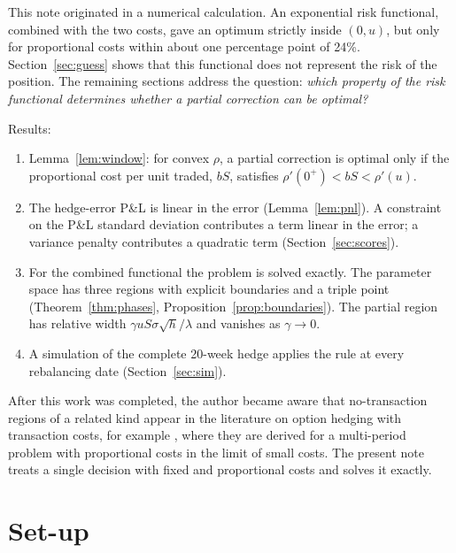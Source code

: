 \documentclass[11pt,a4paper]{article}
\theoremstyle{remark}
\begin{document}
This note originated in a numerical calculation. An exponential risk functional, combined
with the two costs, gave an optimum strictly inside $(0,u)$, but only for proportional costs
within about one percentage point of 24\%. Section~\ref{sec:guess} shows that this
functional does not represent the risk of the position. The remaining sections address the
question: \emph{which property of the risk functional determines whether a partial
correction can be optimal?}

Results:
\begin{enumerate}
  \item Lemma~\ref{lem:window}: for convex $\rho$, a partial correction is optimal only if
        the proportional cost per unit traded, $bS$, satisfies
        $\rho'(0^+) < bS < \rho'(u)$.
  \item The hedge-error P\&L is linear in the error (Lemma~\ref{lem:pnl}). A constraint on
        the P\&L standard deviation contributes a term linear in the error; a variance
        penalty contributes a quadratic term (Section~\ref{sec:scores}).
  \item For the combined functional the problem is solved exactly. The parameter space has
        three regions with explicit boundaries and a triple point
        (Theorem~\ref{thm:phases}, Proposition~\ref{prop:boundaries}). The partial region
        has relative width $\gamma uS\sigma\sqrt h/\lambda$ and vanishes as $\gamma\to 0$.
  \item A simulation of the complete 20-week hedge applies the rule at every rebalancing
        date (Section~\ref{sec:sim}).
\end{enumerate}

After this work was completed, the author became aware that no-transaction regions of a
related kind appear in the literature on option hedging with transaction costs, for example
\cite{whalley1997}, where they are derived for a multi-period problem with proportional
costs in the limit of small costs. The present note treats a single decision with fixed and
proportional costs and solves it exactly.

\section{Set-up}\label{sec:setup}
\end{document}
